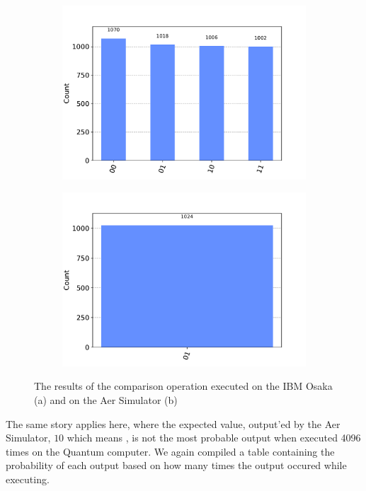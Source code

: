 \begin{figure}[!h]
    \centering
    \begin{subfigure}{0.5\textwidth}
        \centering
        \includegraphics[scale=0.4]{images/6_Complete_System/nko_cmp_ibmq_result.pdf}
        \caption{}    
    \end{subfigure}
    \begin{subfigure}{0.5\textwidth}
        \centering
        \includegraphics[scale=0.4]{images/6_Complete_System/nko_cmp_aer_result.pdf}
        \caption{}
    \end{subfigure}
    \caption{The results of the comparison operation executed on the IBM Osaka (a) and on the Aer Simulator (b)}
\end{figure}

The same story applies here, where the expected value, output'ed by the Aer Simulator, $10$ which means , is not the most probable output when executed
4096 times on the Quantum computer. We again compiled a table containing the probability of each output based on how many times the output occured while executing.

